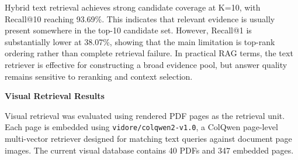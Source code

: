 \begin{table}[H]
    \centering
    \caption{Hybrid Text Retrieval Performance on PDF Dataset (n = 600)}
    \label{tab:hybrid_text_pdf_retrieval}
\end{table}

Hybrid text retrieval achieves strong candidate coverage at K=10, with Recall@10 reaching 93.69\%. This indicates that relevant evidence is usually present somewhere in the top-10 candidate set. However, Recall@1 is substantially lower at 38.07\%, showing that the main limitation is top-rank ordering rather than complete retrieval failure. In practical RAG terms, the text retriever is effective for constructing a broad evidence pool, but answer quality remains sensitive to reranking and context selection.

\textbf{Visual Retrieval Results}

Visual retrieval was evaluated using rendered PDF pages as the retrieval unit. Each page is embedded using \texttt{vidore/colqwen2-v1.0}, a ColQwen page-level multi-vector retriever designed for matching text queries against document page images. The current visual database contains 40 PDFs and 347 embedded pages.

\begin{table}[H]
    \centering
    \caption{Visual Retrieval Performance on PDF Dataset}
    \label{tab:visual_pdf_retrieval}
\end{table}

